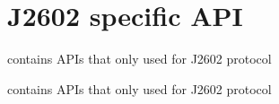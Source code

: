 \hypertarget{group__j2602tl__api__group}{}\section{J2602 specific A\+P\+I}
\label{group__j2602tl__api__group}


contains A\+P\+Is that only used for J2602 protocol  


contains A\+P\+Is that only used for J2602 protocol 

